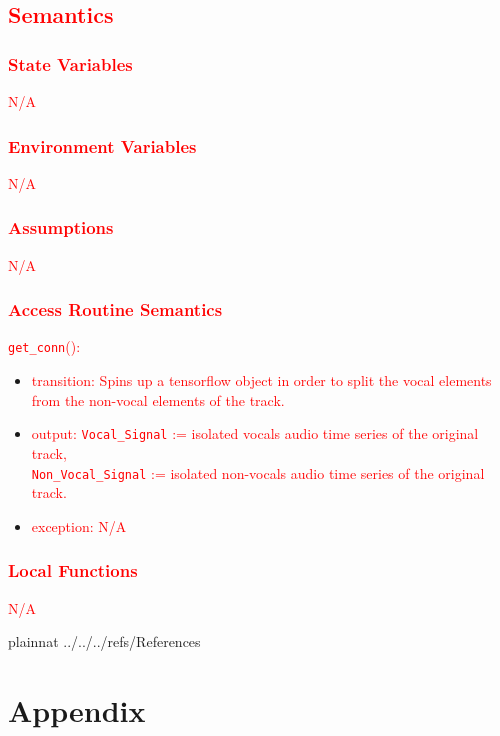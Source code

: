 \documentclass[12pt, titlepage]{article}
\begin{document}
\subsection{\textcolor{red}{Semantics}}

\subsubsection{\textcolor{red}{State Variables}}
\textcolor{red}{N/A}

\subsubsection{\textcolor{red}{Environment Variables}}
\textcolor{red}{N/A}

\subsubsection{\textcolor{red}{Assumptions}}
\textcolor{red}{N/A}

\subsubsection{\textcolor{red}{Access Routine Semantics}}

\noindent \textcolor{red}{\texttt{get\_conn}():}
\begin{itemize}
  \item \textcolor{red}{transition: Spins up a tensorflow object in order to split the vocal elements from the non-vocal elements of the track.}
  \item \textcolor{red}{output: \texttt{Vocal\_Signal} := isolated vocals audio time series of the original track,\\ \texttt{Non\_Vocal\_Signal} := isolated non-vocals audio time series of the original track.}
  \item \textcolor{red}{exception: N/A}
\end{itemize}

\subsubsection{\textcolor{red}{Local Functions}}
\textcolor{red}{N/A}


\newpage

 {plainnat}
 {../../../refs/References}

\newpage

\section{Appendix} \label{Appendix}
\end{document}
